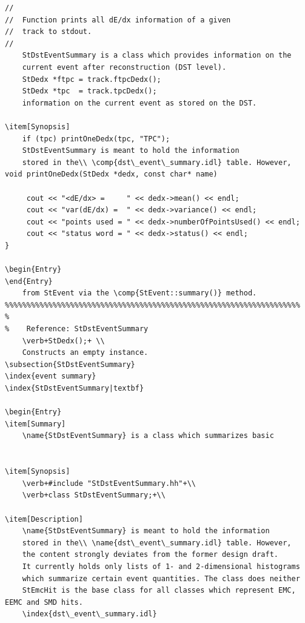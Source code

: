 \item[Examples]
{\footnotesize
\begin{verbatim}
//
//  Function prints all dE/dx information of a given
//  track to stdout.
//
    StDstEventSummary is a class which provides information on the
    current event after reconstruction (DST level). 
    StDedx *ftpc = track.ftpcDedx();
    StDedx *tpc  = track.tpcDedx();
    information on the current event as stored on the DST. 
    
\item[Synopsis] 
    if (tpc) printOneDedx(tpc, "TPC");
    StDstEventSummary is meant to hold the information
    stored in the\\ \comp{dst\_event\_summary.idl} table. However,
void printOneDedx(StDedx *dedx, const char* name)

     cout << "<dE/dx> =     " << dedx->mean() << endl;
     cout << "var(dE/dx) =  " << dedx->variance() << endl;
     cout << "points used = " << dedx->numberOfPointsUsed() << endl;
     cout << "status word = " << dedx->status() << endl;
}
    
\begin{Entry}
\end{Entry}
    from StEvent via the \comp{StEvent::summary()} method.
%%%%%%%%%%%%%%%%%%%%%%%%%%%%%%%%%%%%%%%%%%%%%%%%%%%%%%%%%%%%%%%%%%%%
%
%    Reference: StDstEventSummary
    \verb+StDedx();+ \\
    Constructs an empty instance.
\subsection{StDstEventSummary}
\index{event summary}
\index{StDstEventSummary|textbf}
    
\begin{Entry}
\item[Summary]
    \name{StDstEventSummary} is a class which summarizes basic
    

\item[Synopsis]
    \verb+#include "StDstEventSummary.hh"+\\
    \verb+class StDstEventSummary;+\\

\item[Description]
    \name{StDstEventSummary} is meant to hold the information
    stored in the\\ \name{dst\_event\_summary.idl} table. However,
    the content strongly deviates from the former design draft.
    It currently holds only lists of 1- and 2-dimensional histograms
    which summarize certain event quantities. The class does neither
    StEmcHit is the base class for all classes which represent EMC, EEMC and SMD hits.
    \index{dst\_event\_summary.idl}


\end{verbatim}}
